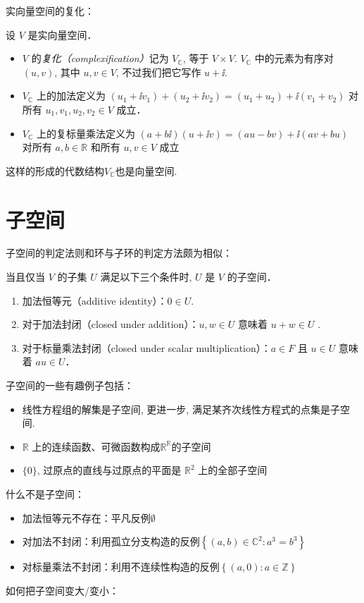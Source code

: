 实向量空间的复化：
\begin{definition}
    设 \(V\) 是实向量空间．
    \begin{itemize}
        \item \(V\) 的\emph{复化（complexification）}记为
            \(V_{\mathbb{C}}\), 等于 \(V \times
            V\). \(V_{\mathbb{C}}\)
            中的元素为有序对 \((u, v)\), 其中
            \(u, v \in V\), 不过我们把它写作 \(u + \ii \).
        \item \(V_{\mathbb{C}}\) 上的加法定义为
            \((u_1 + \ii v_1) + (u_2 + \ii v_2) = (u_1 +
            u_2) + \ii (v_1 + v_2)\)
            对所有 \(u_1, v_1, u_2, v_2 \in V\) 成立．
        \item \(V_{\mathbb{C}}\) 上的复标量乘法定义为
            \((a + b\ii) (u + \ii v) =
                (au - bv) +
            \ii (av + bu)\)
            对所有 \(a, b \in \mathbb{R}\) 和所有 \(u, v \in V\) 成立
    \end{itemize}
\end{definition}
这样的形成的代数结构\(V_{\mathbb{C}}\)也是向量空间.

\section{子空间}
子空间的判定法则和环与子环的判定方法颇为相似：
\begin{theorem}[子空间的条件]
    当且仅当 \(V\) 的子集 \(U\) 满足以下三个条件时, \(U\) 是 \(V\) 的子空间．
    \begin{enumerate}
        \item 加法恒等元（additive identity）：\(0 \in U\).
        \item 对于加法封闭（closed under addition）：\(u, w \in U\)
            意味着 \(u + w \in U\) .
        \item 对于标量乘法封闭（closed under scalar
            multiplication）：\(a \in F\)  且 \(u \in U\) 意味着
            \(au \in U\)．
    \end{enumerate}
\end{theorem}
子空间的一些有趣例子包括：
\begin{itemize}
    \item 线性方程组的解集是子空间, 更进一步, 满足某齐次线性方程式的点集是子空间.
    \item \(\mathbb{R}\)
        上的连续函数、可微函数构成\(\mathbb{R}^{\mathbb{R}}\)的子空间
    \item \(\{0\}\), 过原点的直线与过原点的平面是 \(\mathbb{R}^{2}\) 上的全部子空间
\end{itemize}
什么不是子空间：
\begin{itemize}\label{item:subspace counterexample}
    \item 加法恒等元不存在：平凡反例\(\emptyset\)
    \item 对加法不封闭：利用孤立分支构造的反例\(\left\{ (a,b)\in
        \mathbb{C}^{2}: a^{3}=b^{3}\right\}\)
    \item 对标量乘法不封闭：利用不连续性构造的反例\(\left\{(a,0):a\in
        \mathbb{Z}\right\}\)
\end{itemize}

如何把子空间变大/变小：
